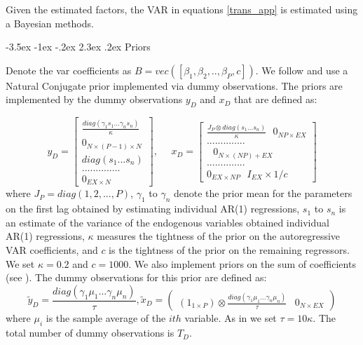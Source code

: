 \documentclass[a4paper,12pt]{article}%
\makeatletter
\renewcommand\subsection{\@startsection {subsection}{2}{\z@}%
                  {-3.5ex \@plus -1ex \@minus -.2ex}%
                  {2.3ex \@plus.2ex}%
                  {\centering\normalsize\scshape\color{black}}}
\makeatother
\begin{document}
Given the estimated factors, the VAR in equations \ref{trans_app} is
estimated using a Bayesian methods.

\subsection{Priors}

Denote the var coefficients as $B=vec\left( \left[ \beta _{1},\beta
_{2},..,\beta _{P},c\right] \right) $.  
We follow \citet{banbura2007bayesian} and use a Natural Conjugate prior
implemented via dummy observations. The priors are implemented by the dummy observations $y_{D}$ and $x_{D}$ that are defined as:

\begin{equation}
y_{D}=\left[ 
\begin{array}{c}
\frac{diag\left( \gamma _{1}s_{1}...\gamma _{n}s_{n}\right) }{\kappa } \\ 
0_{N\times \left( P-1\right) \times N} \\ 
diag\left( s_{1}...s_{n}\right)  \\ 
.............. \\ 
0_{EX\times N}%
\end{array}%
\right] ,\ \ \ \ \ \ x_{D}=\left[ 
\begin{array}{c}
\frac{J_{P}\otimes diag\left( s_{1}...s_{n}\right) }{\kappa }\text{ }%
0_{NP\times EX} \\ 
..............\ \ \ \ \ \ \  \\ 
\text{ }0_{N\times (NP)+EX} \\ 
.............. \\ 
0_{EX\times NP}\text{ \ \ \ \ \ \ \ \ }I_{EX}\times 1/c%
\end{array}%
\right] 
\end{equation}%
where $J_{P}=diag(1,2,...,P)$, $\gamma _{1}$ to $\gamma _{n}$ denote the
prior mean for the parameters on the first lag obtained by estimating
individual AR(1) regressions, $s_{1}$ to $s_{n}$ is an estimate of the
variance of the endogenous variables obtained individual AR(1) regressions, $%
\kappa $ measures the tightness of the prior on the autoregressive VAR
coefficients, and $c$ is the tightness of the prior on the remaining
regressors. We set $\kappa =0.2$ and $c=1000$. We also implement priors on the
sum of coefficients (see \citet{banbura2007bayesian}). The dummy observations
for this prior are defined as:%
\begin{equation}
\tilde{y}_{D}=\frac{diag\left( \gamma _{1}\mu _{1}...\gamma _{n}\mu
_{n}\right) }{\tau },\tilde{x}_{D}=\left( 
\begin{array}{cc}
\left( 1_{1\times P}\right) \otimes \frac{diag\left( \gamma _{1}\mu
_{1}...\gamma _{n}\mu _{n}\right) }{\tau } & 0_{N\times EX}%
\end{array}%
\right) 
\end{equation}%
where $\mu _{i}$ is the sample average of the $ith$ variable. As in \citet{banbura2007bayesian} we set $\tau =10\kappa $. The total number of dummy observations is $T_{D}$.
\end{document}
